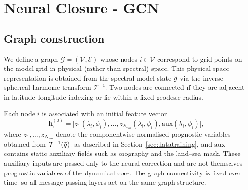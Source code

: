 \section{Neural Closure - GCN}
\label{sec:neural-closure}

\subsection{Graph construction}
We define a graph $\mathcal{G} = (\mathcal{V}, \mathcal{E})$ whose nodes $i \in \mathcal{V}$ correspond to grid points on the model grid in physical (rather than spectral) space. This physical-space representation is obtained from the spectral model state $\Tilde{g}$ via the inverse spherical harmonic transform $\mathcal{T}^{-1}$. Two nodes are connected if they are adjacent in latitude--longitude indexing or lie within a fixed geodesic radius.

Each node $i$ is associated with an initial feature vector
\begin{equation}
  \mathbf{h}_i^{(0)}
  =
  \bigl[
    z_1(\lambda_i,\phi_i), \dots, z_{N_{\text{var}}}(\lambda_i,\phi_i),
    \mathrm{aux}(\lambda_i,\phi_i)
  \bigr],
\end{equation}
where $z_1,\dots,z_{N_{\text{var}}}$ denote the componentwise normalised prognostic variables obtained from $\mathcal{T}^{-1}(\Tilde{g})$, as described in Section~\ref{sec:datatraining}, and $\mathrm{aux}$ contains static auxiliary fields such as orography and the land--sea mask. These auxiliary inputs are passed only to the neural correction and are not themselves prognostic variables of the dynamical core. The graph connectivity is fixed over time, so all message-passing layers act on the same graph structure.

